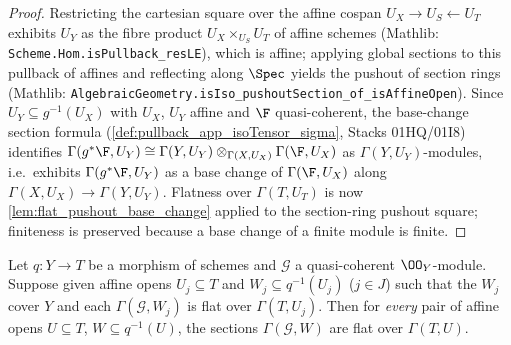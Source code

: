 \begin{proof}
  \leanok
  Restricting the cartesian square over the affine cospan
  \(U_X \to U_S \leftarrow U_T\) exhibits \(U_Y\) as the fibre product
  \(U_X \times_{U_S} U_T\) of affine schemes
  (Mathlib: \texttt{Scheme.Hom.isPullback\_resLE}), which is affine; applying
  global sections to this pullback of affines and reflecting along
  \(\Spec\) yields the pushout of section rings (Mathlib:
  \texttt{AlgebraicGeometry.isIso\_pushoutSection\_of\_isAffineOpen}).
  Since \(U_Y \subseteq g^{-1}(U_X)\) with \(U_X\), \(U_Y\) affine and
  \(\F\) quasi-coherent, the base-change section formula
  (\cref{def:pullback_app_isoTensor_sigma}, Stacks 01HQ/01I8) identifies
  \(\Gamma(g^* \F, U_Y) \cong
    \Gamma(Y, U_Y) \otimes_{\Gamma(X, U_X)} \Gamma(\F, U_X)\)
  as \(\Gamma(Y, U_Y)\)-modules, i.e.\ exhibits \(\Gamma(g^*\F, U_Y)\) as a
  base change of \(\Gamma(\F, U_X)\) along
  \(\Gamma(X, U_X) \to \Gamma(Y, U_Y)\).  Flatness over \(\Gamma(T, U_T)\)
  is now \cref{lem:flat_pushout_base_change} applied to the section-ring
  pushout square; finiteness is preserved because a base change of a finite
  module is finite.
\end{proof}

\begin{lemma}

\leanok
  \label{lem:flat_affine_local}
  Let \(q : Y \to T\) be a morphism of schemes and \(\mathcal G\) a quasi-coherent
  \(\OO_Y\)-module.  Suppose given affine opens
  \(U_j \subseteq T\) and \(W_j \subseteq q^{-1}(U_j)\) (\(j \in J\)) such
  that the \(W_j\) cover \(Y\) and each \(\Gamma(\mathcal G, W_j)\) is flat over
  \(\Gamma(T, U_j)\).  Then for \emph{every} pair of affine opens
  \(U \subseteq T\), \(W \subseteq q^{-1}(U)\), the sections
  \(\Gamma(\mathcal G, W)\) are flat over \(\Gamma(T, U)\).
\end{lemma}

